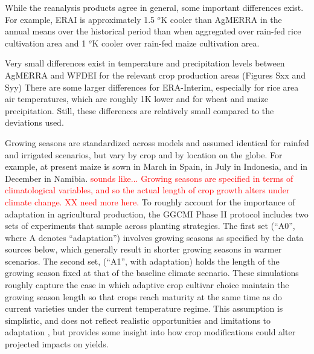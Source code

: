 \documentclass[gmd, manuscript]{copernicus} %
\begin{document}
While the reanalysis products agree in general, some important differences exist. For example, ERAI is approximately 1.5 $^o$K cooler than AgMERRA in the annual means over the historical period than when aggregated over rain-fed rice cultivation area and 1 $^o$K cooler over rain-fed maize cultivation area.

Very small differences exist in temperature and precipitation levels between AgMERRA and WFDEI for the relevant crop production areas (Figures Sxx and Syy)
There are some larger differences for ERA-Interim, especially for rice area air temperatures, which are roughly 1K lower and for wheat and maize precipitation.
Still, these differences are relatively small compared to the deviations used.


Growing seasons are standardized across models and assumed identical for rainfed and irrigated scenarios, but vary by crop and by location on the globe. 
For example, at present maize is sown in March in Spain, in July in Indonesia, and in December in Namibia. 
\textcolor{red}{sounds like... Growing seasons are specified in terms of climatological variables, and so the actual length of crop growth alters under climate change. XX need more here.} To roughly account for the importance of adaptation in agricultural production, the GGCMI Phase II protocol includes two sets of experiments that sample across planting strategies. The first set (``A0'', where A denotes ``adaptation'') involves growing seasons as specified by the data sources below, which generally result in shorter growing seasons in warmer scenarios. The second set, (``A1'', with adaptation) holds the length of the growing season fixed at that of the baseline climate scenario. These simulations roughly capture the case in which adaptive crop cultivar choice maintain the growing season length so that crops reach maturity at the same time as do current varieties under the current temperature regime. This assumption is simplistic, and does not reflect realistic opportunities and limitations to adaptation \citep{vadez2012adaptation,challinor2018improving}, but provides some insight into how crop modifications could alter projected impacts on yields.
\end{document}
